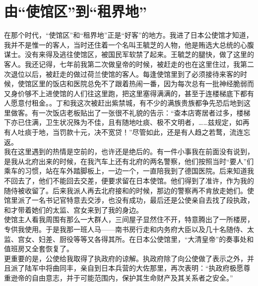 \fancyhead[RO]{} %
\fancyhead[LE]{} %
\chapter*{由“使馆区”到“租界地”}
\thispagestyle{empty}
在那个时代，“使馆区”和“租界地”正是“好客”的地方。我进了日本公使馆才知道，我并不是惟一的客人，当时还住着一个名叫王毓芝的人物，他是贿选大总统的心腹谋士。没有来得及逃往使馆区，被国民军软禁了起来。王毓芝的腿快，做了这里的客人。我还记得，七年前我第二次做皇帝的时候，被赶走的也在这里住过，我第二次退位以后，被赶走的做过荷兰使馆的客人。每逢使馆里到了必须接待来客的时候，使馆区里的饭店和医院总免不了跟着热闹一番，因为每次总有一批神经脆弱而又身价够不上进使馆的人们往这里跑，把这里塞得满满的，甚至于连楼梯底下都有人愿意付租金。。丁和我这次被赶出紫禁城，有不少的满族贵族都争先恐后地到这里做客。有一次饭店老板贴出了一张很不礼貌的告示：“查本店寄居者过多，楼梯下亦已住满，卫生状况殊为不佳，且有随地吐痰、极不文明者，……兹规定，如再有人吐痰于地，当罚款十元，决不宽贷！”尽管如此，还是有人趋之若鹜，流连忘返。\\

我在这里遇到的热情是空前的，也许还是绝后的。有一件小事我在前面没有说到，是我从北府出来的时候，在我汽车上还有北府的两名警察，他们按照当时“要人”们乘车的习惯，站在车外踏脚板上，一边一个，一直陪我到了德国医院。后来知道我不回去了，他们不能回去交差，便要求留在日本使馆。他们得到了准许，作为我的随侍被收留了。后来我派人再去北府接和的时候，那边的警察再不肯放走她们。使馆里派了一名书记官特意去交涉，也没有成功，最后还是公使亲自去找了段执政，和才带着她们的太监、宫女来到了我的身边。\\

使馆主人看我周围有那么一大群人，三间屋子显然住不开，特意腾出了一所楼房，专供我使用。于是我那一班人马——南书房行走和内务府大臣以及几十名随侍、太监、宫女、妇差、厨役等等又各得其所。在日本公使馆里，“大清皇帝”的奏事处和值班房又全套恢复了。\\

更重要的是，公使给我取得了执政府的谅解。执政府除了向公使做了表示之外，并且派了陆军中将曲同丰，亲自到日本兵营的大佐那里，再次表明：“执政府极愿尊重逊帝的自由意志，并于可能范围内，保护其生命财产及其关系者之安全。”\\

